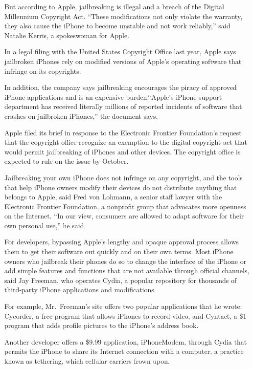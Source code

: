 \documentclass[12pt,a4paper,onecolumn]{article}
\begin{document}
But according to Apple, jailbreaking is illegal and a breach of the Digital Millennium Copyright
Act. ``These modifications not only violate the warranty, they also cause the iPhone to become
unstable and not work reliably,'' said Natalie Kerris, a spokeswoman for Apple.

In a legal filing with the United States Copyright Office last year, Apple says jailbroken iPhones
rely on modified versions of Apple's operating software that infringe on its copyrights.

In addition, the company says jailbreaking encourages the piracy of approved iPhone applications and
is an expensive burden.``Apple's iPhone support department has received literally millions of
reported incidents of software that crashes on jailbroken iPhones,'' the document says.

Apple filed its brief in response to the Electronic Frontier Foundation's request that the copyright
office recognize an exemption to the digital copyright act that would permit jailbreaking of iPhones
and other devices. The copyright office is expected to rule on the issue by October.

Jailbreaking your own iPhone does not infringe on any copyright, and the tools that help iPhone
owners modify their devices do not distribute anything that belongs to Apple, said Fred von Lohmann,
a senior staff lawyer with the Electronic Frontier Foundation, a nonprofit group that advocates more
openness on the Internet. ``In our view, consumers are allowed to adapt software for their own
personal use,'' he said.

For developers, bypassing Apple's lengthy and opaque approval process allows them to get their
software out quickly and on their own terms. Most iPhone owners who jailbreak their phones do so to
change the interface of the iPhone or add simple features and functions that are not available
through official channels, said Jay Freeman, who operates Cydia, a popular repository for thousands
of third-party iPhone applications and modifications.

For example, Mr.~Freeman's site offers two popular applications that he wrote: Cycorder, a free
program that allows iPhones to record video, and Cyntact, a \$1 program that adds profile pictures
to the iPhone's address book.

Another developer offers a \$9.99 application, iPhoneModem, through Cydia that permits the iPhone to
share its Internet connection with a computer, a practice known as tethering, which cellular
carriers frown upon.
\end{document}
